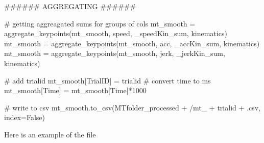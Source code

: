 \documentclass[
  letterpaper,
  DIV=11,
  numbers=noendperiod]{scrreprt}
\newenvironment{Shaded}{\begin{snugshade}}{\end{snugshade}}
\newcommand{\CommentTok}[1]{\textcolor[rgb]{0.37,0.37,0.37}{#1}}
\newcommand{\DecValTok}[1]{\textcolor[rgb]{0.68,0.00,0.00}{#1}}
\newcommand{\NormalTok}[1]{\textcolor[rgb]{0.00,0.23,0.31}{#1}}
\newcommand{\OperatorTok}[1]{\textcolor[rgb]{0.37,0.37,0.37}{#1}}
\newcommand{\StringTok}[1]{\textcolor[rgb]{0.13,0.47,0.30}{#1}}
\newcommand{\VariableTok}[1]{\textcolor[rgb]{0.07,0.07,0.07}{#1}}
\begin{document}
\begin{Shaded}
\begin{Highlighting}[]
    \CommentTok{\#\#\#\#\#\# AGGREGATING \#\#\#\#\#\#}

    \CommentTok{\# getting aggreagated sums for groups of cols}
\NormalTok{    mt\_smooth }\OperatorTok{=}\NormalTok{ aggregate\_keypoints(mt\_smooth, }\StringTok{\textquotesingle{}speed\textquotesingle{}}\NormalTok{, }\StringTok{\textquotesingle{}\_speedKin\_sum\textquotesingle{}}\NormalTok{, }\StringTok{\textquotesingle{}kinematics\textquotesingle{}}\NormalTok{)}
\NormalTok{    mt\_smooth }\OperatorTok{=}\NormalTok{ aggregate\_keypoints(mt\_smooth, }\StringTok{\textquotesingle{}acc\textquotesingle{}}\NormalTok{, }\StringTok{\textquotesingle{}\_accKin\_sum\textquotesingle{}}\NormalTok{, }\StringTok{\textquotesingle{}kinematics\textquotesingle{}}\NormalTok{)}
\NormalTok{    mt\_smooth }\OperatorTok{=}\NormalTok{ aggregate\_keypoints(mt\_smooth, }\StringTok{\textquotesingle{}jerk\textquotesingle{}}\NormalTok{, }\StringTok{\textquotesingle{}\_jerkKin\_sum\textquotesingle{}}\NormalTok{, }\StringTok{\textquotesingle{}kinematics\textquotesingle{}}\NormalTok{)}

    \CommentTok{\# add trialid}
\NormalTok{    mt\_smooth[}\StringTok{\textquotesingle{}TrialID\textquotesingle{}}\NormalTok{] }\OperatorTok{=}\NormalTok{ trialid}
    \CommentTok{\# convert time to ms}
\NormalTok{    mt\_smooth[}\StringTok{\textquotesingle{}Time\textquotesingle{}}\NormalTok{] }\OperatorTok{=}\NormalTok{ mt\_smooth[}\StringTok{\textquotesingle{}Time\textquotesingle{}}\NormalTok{]}\OperatorTok{*}\DecValTok{1000}

    \CommentTok{\# write to csv}
\NormalTok{    mt\_smooth.to\_csv(MTfolder\_processed }\OperatorTok{+} \StringTok{\textquotesingle{}/mt\_\textquotesingle{}} \OperatorTok{+}\NormalTok{ trialid }\OperatorTok{+} \StringTok{\textquotesingle{}.csv\textquotesingle{}}\NormalTok{, index}\OperatorTok{=}\VariableTok{False}\NormalTok{)}
\end{Highlighting}
\end{Shaded}

Here is an example of the file
\end{document}
